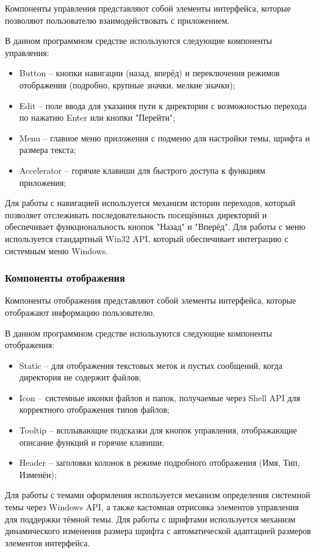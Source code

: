 Компоненты управления представляют собой элементы интерфейса,
которые позволяют пользователю взаимодействовать с
приложением.

В данном программном средстве используются следующие
компоненты управления:

\begin{itemize}
    \item Button -- кнопки навигации (назад, вперёд) и переключения режимов отображения (подробно, крупные значки, мелкие значки);
    \item Edit -- поле ввода для указания пути к директории с возможностью перехода по нажатию Enter или кнопки "Перейти";
    \item Menu -- главное меню приложения с подменю для настройки темы, шрифта и размера текста;
    \item Accelerator -- горячие клавиши для быстрого доступа к функциям приложения;
\end{itemize}

Для работы с навигацией используется механизм истории
переходов, который позволяет отслеживать последовательность
посещённых директорий и обеспечивает функциональность кнопок
"Назад" и "Вперёд". Для работы с меню используется
стандартный Win32 API, который обеспечивает интеграцию
с системным меню Windows.

\subsubsection{Компоненты отображения}

Компоненты отображения представляют собой элементы интерфейса,
которые отображают информацию пользователю.

В данном программном средстве используются следующие
компоненты отображения:

\begin{itemize}
    \item Static -- для отображения текстовых меток и пустых сообщений, когда директория не содержит файлов;
    \item Icon -- системные иконки файлов и папок, получаемые через Shell API для корректного отображения типов файлов;
    \item Tooltip -- всплывающие подсказки для кнопок управления, отображающие описание функций и горячие клавиши;
    \item Header -- заголовки колонок в режиме подробного отображения (Имя, Тип, Изменён);
\end{itemize}

Для работы с темами оформления используется механизм
определения системной темы через Windows API, а также
кастомная отрисовка элементов управления для поддержки
тёмной темы. Для работы с шрифтами используется механизм
динамического изменения размера шрифта с автоматической
адаптацией размеров элементов интерфейса.

